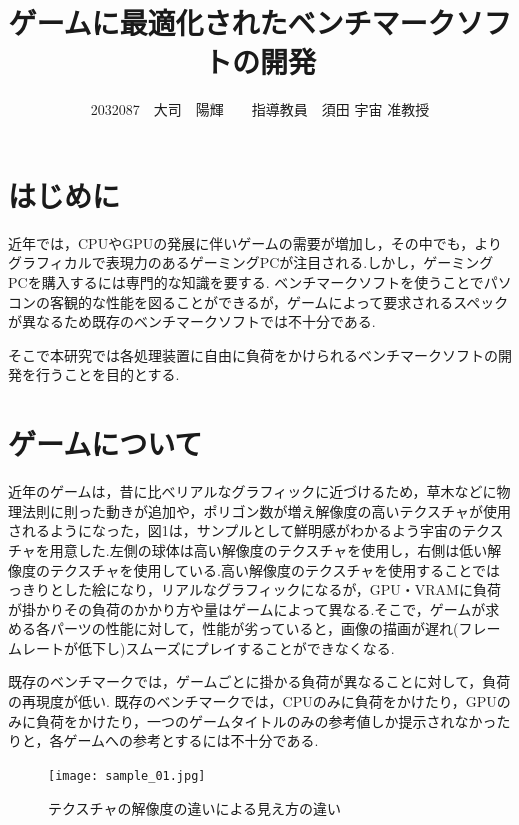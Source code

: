 \documentclass[twocolumn,10pt,a4j]{ltjsarticle}
\title{ゲームに最適化されたベンチマークソフトの開発}
\author{2032087　大司　陽輝　　指導教員　須田 宇宙 准教授}
\date{}
\begin{document}
\maketitle

\section{はじめに}
近年では，CPUやGPUの発展に伴いゲームの需要が増加し，その中でも，よりグラフィカルで表現力のあるゲーミングPCが注目される.しかし，ゲーミングPCを購入するには専門的な知識を要する.
ベンチマークソフトを使うことでパソコンの客観的な性能を図ることができるが，ゲームによって要求されるスペックが異なるため既存のベンチマークソフトでは不十分である.

そこで本研究では各処理装置に自由に負荷をかけられるベンチマークソフトの開発を行うことを目的とする.

\section{ゲームについて}
近年のゲームは，昔に比べリアルなグラフィックに近づけるため，草木などに物理法則に則った動きが追加や，ポリゴン数が増え解像度の高いテクスチャが使用されるようになった，図1は，サンプルとして鮮明感がわかるよう宇宙のテクスチャを用意した.左側の球体は高い解像度のテクスチャを使用し，右側は低い解像度のテクスチャを使用している.高い解像度のテクスチャを使用することではっきりとした絵になり，リアルなグラフィックになるが，GPU・VRAMに負荷が掛かりその負荷のかかり方や量はゲームによって異なる.そこで，ゲームが求める各パーツの性能に対して，性能が劣っていると，画像の描画が遅れ(フレームレートが低下し)スムーズにプレイすることができなくなる.%

既存のベンチマークでは，ゲームごとに掛かる負荷が異なることに対して，負荷の再現度が低い.
既存のベンチマークでは，CPUのみに負荷をかけたり，GPUのみに負荷をかけたり，一つのゲームタイトルのみの参考値しか提示されなかったりと，各ゲームへの参考とするには不十分である.

\begin{figure}[H]
\begin{center}
 \texttt{[image: sample\_01.jpg]}
\end{center}
 \caption{テクスチャの解像度の違いによる見え方の違い}
 \label{fig:図1}
\end{figure}
\vspace{-2mm}
\end{document}
